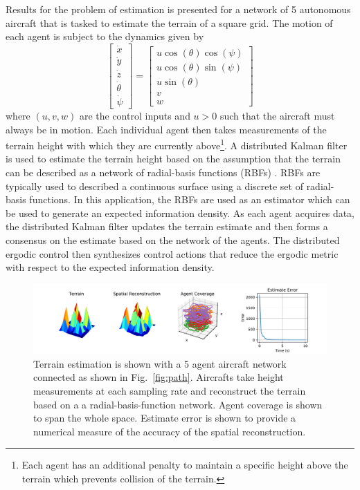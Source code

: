 \documentclass[conference]{IEEEtran}
\begin{document}
Results for the problem of estimation is presented for a network of 5 autonomous aircraft that is tasked to estimate the terrain of a square grid. The motion of each agent is subject to the dynamics given by
\begin{equation*}
\begin{bmatrix}
\dot{x}  \\
\dot{y} \\
\dot{z} \\
\dot{\theta} \\
\dot{\psi}
\end{bmatrix} =
\begin{bmatrix}
u \cos(\theta) \cos(\psi) \\
u \cos(\theta) \sin(\psi) \\
u \sin(\theta) \\
v \\
w
\end{bmatrix}
\end{equation*}
where $(u,v,w)$ are the control inputs and $u > 0$ such that the aircraft must always be in motion. Each individual agent then takes measurements of the terrain height with which they are currently above\footnote{Each agent has an additional penalty to maintain a specific height above the terrain which prevents collision of the terrain.}. A distributed Kalman filter is used to estimate the terrain height based on the assumption that the terrain can be described as a network of radial-basis functions (RBFs) \cite{du2014radial}. RBFs are typically used to described a continuous surface using a discrete set of radial-basis functions. In this application, the RBFs are used as an estimator which can be used to generate an expected information density. As each agent acquires data, the distributed Kalman filter updates the terrain estimate and then forms a consensus on the estimate based on the network of the agents. The distributed ergodic control then synthesizes control actions that reduce the ergodic metric with respect to the expected information density.

\begin{figure}[!th]
\centering
\includegraphics[scale=0.6]{figures/terrain_estimation.pdf}
\caption{ Terrain estimation is shown with a 5 agent aircraft network connected as shown in Fig.~\ref{fig:path}. Aircrafts take height measurements at each sampling rate and reconstruct the terrain based on a a radial-basis-function network. Agent coverage is shown to span the whole space. Estimate error is shown to provide a numerical measure of the accuracy of the spatial reconstruction.  }
\label{fig:estimation}
\end{figure}
\end{document}
